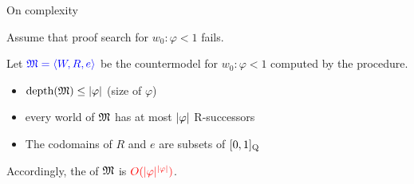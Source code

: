 \begin{frame}{On complexity}

  Assume that proof search for  $w_0:\varphi<1$ fails.

 \smallskip
 Let ${\color{blue} \mathfrak{M}=\langle W,R,e \rangle}$ be the countermodel for $w_0:\varphi<1$ computed by the procedure.

 \begin{center}
  \end{center}


  
  

  \begin{itemize}
  \item[$\surd$]   $\text{depth}(\mathfrak{M})\leq|\varphi|$ (size of $\varphi$)

  \item[$\surd$]  every world of $\mathfrak{M}$ has at most $|\varphi|$ R-successors

  \item[$\surd$]  The codomains of $R$ and $e$ are  subsets   of $[0,1]_{\mathrm{Q}}$\\
\end{itemize}

\smallskip
Accordingly, the  of $\mathfrak{M}$ is $\color{red} O(|\varphi|^{|\varphi|})$.



\end{frame}



